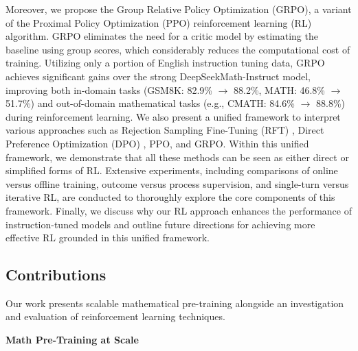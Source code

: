 Moreover, we propose the Group Relative Policy Optimization (GRPO), a variant of the Proximal Policy Optimization (PPO) \citep{schulman2017proximal} reinforcement learning (RL) algorithm. GRPO eliminates the need for a critic model by estimating the baseline using group scores, which considerably reduces the computational cost of training. Utilizing only a portion of English instruction tuning data, GRPO achieves significant gains over the strong DeepSeekMath-Instruct model, improving both in-domain tasks (GSM8K: 82.9\% $\rightarrow$ 88.2\%, MATH: 46.8\% $\rightarrow$ 51.7\%) and out-of-domain mathematical tasks (e.g., CMATH: 84.6\% $\rightarrow$ 88.8\%) during reinforcement learning. We also present a unified framework to interpret various approaches such as Rejection Sampling Fine-Tuning (RFT) \citep{yuan2023scaling}, Direct Preference Optimization (DPO) \citep{dpo}, PPO, and GRPO. Within this unified framework, we demonstrate that all these methods can be seen as either direct or simplified forms of RL. Extensive experiments, including comparisons of online versus offline training, outcome versus process supervision, and single-turn versus iterative RL, are conducted to thoroughly explore the core components of this framework. Finally, we discuss why our RL approach enhances the performance of instruction-tuned models and outline future directions for achieving more effective RL grounded in this unified framework.

\subsection{Contributions}
Our work presents scalable mathematical pre-training alongside an investigation and evaluation of reinforcement learning techniques.

\textbf{Math Pre-Training at Scale}

